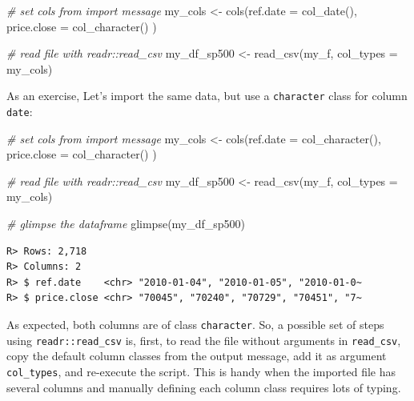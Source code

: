 \documentclass[
  12pt,
]{book}
\newenvironment{Shaded}{\begin{snugshade}}{\end{snugshade}}
\newcommand{\AttributeTok}[1]{\textcolor[rgb]{0.61,0.61,0.61}{#1}}
\newcommand{\CommentTok}[1]{\textcolor[rgb]{0.37,0.37,0.37}{\textit{#1}}}
\newcommand{\FunctionTok}[1]{\textcolor[rgb]{0,0,0}{#1}}
\newcommand{\NormalTok}[1]{#1}
\newcommand{\OtherTok}[1]{\textcolor[rgb]{0.37,0.37,0.37}{#1}}
\begin{document}
\begin{Shaded}
\begin{Highlighting}[]
\CommentTok{\# set cols from import message}
\NormalTok{my\_cols }\OtherTok{\textless{}{-}} \FunctionTok{cols}\NormalTok{(}\AttributeTok{ref.date =} \FunctionTok{col\_date}\NormalTok{(),}
                \AttributeTok{price.close =} \FunctionTok{col\_character}\NormalTok{() ) }

\CommentTok{\# read file with readr::read\_csv}
\NormalTok{my\_df\_sp500 }\OtherTok{\textless{}{-}} \FunctionTok{read\_csv}\NormalTok{(my\_f, }\AttributeTok{col\_types =}\NormalTok{ my\_cols)}
\end{Highlighting}
\end{Shaded}

As an exercise, Let's import the same data, but use a \texttt{character} class for column \texttt{date}:

\begin{Shaded}
\begin{Highlighting}[]
\CommentTok{\# set cols from import message}
\NormalTok{my\_cols }\OtherTok{\textless{}{-}} \FunctionTok{cols}\NormalTok{(}\AttributeTok{ref.date =} \FunctionTok{col\_character}\NormalTok{(),}
                \AttributeTok{price.close =} \FunctionTok{col\_character}\NormalTok{() ) }

\CommentTok{\# read file with readr::read\_csv}
\NormalTok{my\_df\_sp500 }\OtherTok{\textless{}{-}} \FunctionTok{read\_csv}\NormalTok{(my\_f, }\AttributeTok{col\_types =}\NormalTok{ my\_cols)}

\CommentTok{\# glimpse the dataframe}
\FunctionTok{glimpse}\NormalTok{(my\_df\_sp500)}
\end{Highlighting}
\end{Shaded}

\begin{verbatim}
R> Rows: 2,718
R> Columns: 2
R> $ ref.date    <chr> "2010-01-04", "2010-01-05", "2010-01-0~
R> $ price.close <chr> "70045", "70240", "70729", "70451", "7~
\end{verbatim}

As expected, both columns are of class \texttt{character}. So, a possible set of steps using \texttt{readr::read\_csv} is, first, to read the file without arguments in \texttt{read\_csv}, copy the default column classes from the output message, add it as argument \texttt{col\_types}, and re-execute the script. This is handy when the imported file has several columns and manually defining each column class requires lots of typing.
\end{document}
